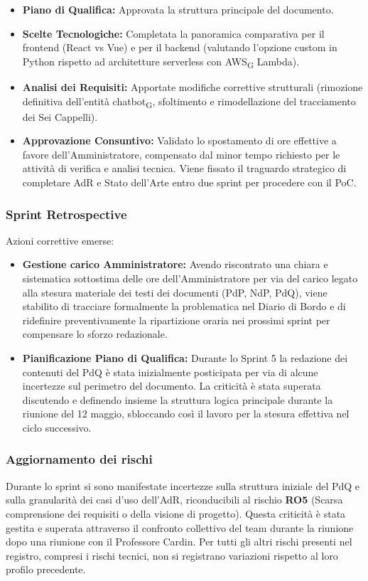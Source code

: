 \begin{itemize}
    \item \textbf{Piano di Qualifica:} Approvata la struttura principale del documento.
    \item \textbf{Scelte Tecnologiche:} Completata la panoramica comparativa per il frontend (React vs Vue) e per il backend (valutando l'opzione custom in Python rispetto ad architetture serverless con AWS\textsubscript{G} Lambda).
    \item \textbf{Analisi dei Requisiti:} Apportate modifiche correttive strutturali (rimozione definitiva dell'entità chatbot\textsubscript{G}, sfoltimento e rimodellazione del tracciamento dei Sei Cappelli).
    \item \textbf{Approvazione Consuntivo:} Validato lo spostamento di ore effettive a favore dell'Amministratore, compensato dal minor tempo richiesto per le attività di verifica e analisi tecnica. Viene fissato il traguardo strategico di completare AdR e Stato dell'Arte entro due sprint per procedere con il PoC.
\end{itemize}

\subsubsection{Sprint Retrospective}
Azioni correttive emerse:
\begin{itemize}
    \item \textbf{Gestione carico Amministratore:} Avendo riscontrato una chiara e sistematica sottostima delle ore dell'Amministratore per via del carico legato alla stesura materiale dei testi dei documenti (PdP, NdP, PdQ), viene stabilito di tracciare formalmente la problematica nel Diario di Bordo e di ridefinire preventivamente la ripartizione oraria nei prossimi sprint per compensare lo sforzo redazionale.
    \item \textbf{Pianificazione Piano di Qualifica:} Durante lo Sprint 5 la redazione dei contenuti del PdQ è stata inizialmente posticipata per via di alcune incertezze sul perimetro del documento. La criticità è stata superata discutendo e definendo insieme la struttura logica principale durante la riunione del 12 maggio, sbloccando così il lavoro per la stesura effettiva nel ciclo successivo.    
\end{itemize}

\subsubsection{Aggiornamento dei rischi}
Durante lo sprint si sono manifestate incertezze sulla struttura iniziale del PdQ e sulla granularità dei casi d'uso dell'AdR, riconducibili al rischio \textbf{RO5} (Scarsa comprensione dei requisiti o della visione di progetto). Questa criticità è stata gestita e superata attraverso il confronto collettivo del team durante la riunione dopo una riunione con il Professore Cardin. Per tutti gli altri rischi presenti nel registro, compresi i rischi tecnici, non si registrano variazioni rispetto al loro profilo precedente.

